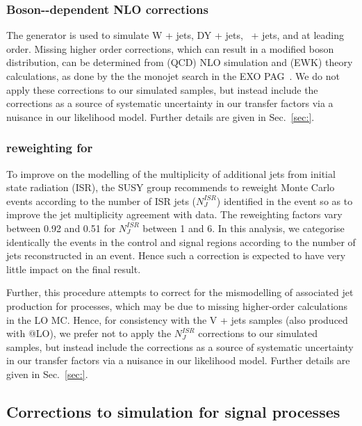 \subsubsection{Boson-\texorpdfstring{\Pt}{pT}-dependent NLO corrections}

The \MADGRAPH generator is used to simulate W + jets, DY + jets,
\znunu\ + jets, and \gj at leading order. Missing higher order
corrections, which can result in a modified boson \Pt distribution,
can be determined from (QCD) NLO simulation and (EWK) theory
calculations, as done by the the monojet search in the EXO
PAG~\cite{}. We do not apply these corrections to our simulated
samples, but instead include the corrections as a source of systematic
uncertainty in our transfer factors via a nuisance in our likelihood
model. Further details are given in Sec.~\ref{sec:}.

\subsubsection{\texorpdfstring{\nisr}{Nisr} reweighting for \texorpdfstring{\ttbar}{TTbar}}
\label{sec:nisr}
 
To improve on the \MADGRAPH modelling of the multiplicity of
additional jets from initial state radiation (ISR), the SUSY group
recommends to reweight \MADGRAPH \ttbar Monte Carlo events according
to the number of ISR jets ($N_J^{ISR}$) identified in the event so as
to improve the jet multiplicity agreement with data. The reweighting
factors vary between 0.92 and 0.51 for $N_J^{ISR}$ between 1 and 6. In
this analysis, we categorise identically the events in the control and
signal regions according to the number of jets reconstructed in an
event. Hence such a correction is expected to have very little impact
on the final result. 

Further, this procedure attempts to correct for the mismodelling of
associated jet production for \ttbar processes, which may be due to
missing higher-order calculations in the LO \MADGRAPH MC. Hence, for
consistency with the V + jets samples (also produced with
\MADGRAPH{}@LO), we prefer not to apply the $N_J^{ISR}$ corrections to
our simulated samples, but instead include the corrections as a source
of systematic uncertainty in our transfer factors via a nuisance in
our likelihood model. Further details are given in Sec.~\ref{sec:}.

\subsection{Corrections to simulation for signal processes}


